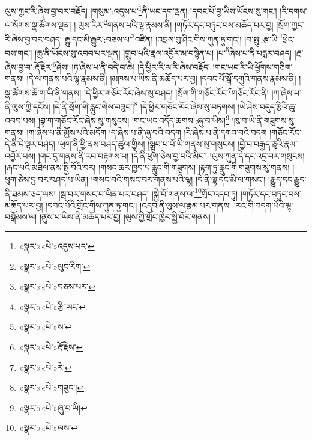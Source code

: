 ལུས་ཀྱང་རི་ཞེས་བྱ་བར་བརྗོད། །གསུམ་:འདུས་པ་\footnote{«སྣར་»«པེ་»འདུས་པར་}ནི་ཡང་དག་ལྡན། །དབང་པོ་བྱ་ཡིས་ཡོངས་སུ་གང་། །རི་དགས་ལ་སོགས་སྣ་ཚོགས་ལྡན། །:ལུས་རིར་\footnote{«སྣར་»«པེ་»ལུང་རིག་}གནས་པའི་ལྷ་རྣམས་ནི། །གཏོར་དང་བཏུང་བས་མཆོད་པར་བྱ། །སྲོག་ཀྱང་རི་ཞེས་བྱ་བར་བཤད། རྒྱུ་དང་མི་རྒྱུར་:བཅས་པ་\footnote{«སྣར་»«པེ་»བཅས་པར་}འཛིན། །འབྲས་བུ་ཤིང་གིས་ཀུན་ཏུ་གང་། །བ་སྤུ་:རྩ་ཡི་\footnote{«སྣར་»«པེ་»རྩི་ཡང་}ཕྲེང་བས་གང་། །ཆུ་ནི་ཡོངས་སུ་འབབ་པར་ལྡན། །གྲུབ་པའི་རྣལ་འབྱོར་མ་བསྙེན་པ། །པ་\footnote{«སྣར་»«པེ་»ས་}ཞེས་པ་ནི་པདྨར་བཤད། །རྦ་ཞེས་བྱ་བ་:རྡོ་རྗེར་\footnote{«སྣར་»«པེ་»རྡོ་རྗེས་}ཤེས། །ཏ་ཞེས་པ་ནི་བདེ་བ་ཆེ། །དེ་ཕྱིར་རི་ལ་རི་ཞེས་བརྗོད། །གང་ཡང་རི་ཡི་ཕྱོགས་གཅིག་གནས། །དེ་ལ་གནས་པའི་ལྷ་རྣམས་ནི། །མཁས་པ་ཡིས་ནི་མཆོད་པར་བྱ། །དབང་པོ་སྒོ་དགུའི་གནས་རྣམས་ནི། །སྣ་ཚོགས་ཆོ་ག་ཡི་ནི་གནས། །དེ་ཕྱིར་གཅོང་རོང་ཞེས་སུ་བཤད། །སྲོག་གི་གཅོང་རོང་\footnote{«སྣར་»«པེ་»རེ་}གཅོང་རོང་ནི། །ཀ་ཞེས་པ་ནི་ལུས་ཀྱི་དངོས། །དེ་ནི་སྲོག་གི་རླུང་གིས་བཟུང་།\footnote{«སྣར་»«པེ་»གཟུང་།} །དེ་ཕྱིར་གཅོང་རོང་ཞེས་སུ་བཏགས། །ཡེ་ཤེས་བདུད་རྩིའི་ཆུ་འབབ་པས། །བྷ་ག་གཅོང་རོང་ཞེས་སུ་གསུངས། །གང་ཡང་འདོད་ཆགས་:ཞུ་བ་ཡིས།\footnote{«སྣར་»«པེ་»ཞུ་བ་ཡི།} །ཁུ་བ་ཡི་ནི་གཟུགས་སུ་གནས། །ཀ་ཞེས་པ་ནི་མྱོས་པའི་མདོག །ད་ཞེས་པ་ནི་ཞུ་བའི་བདག །རི་ཞེས་པ་ནི་དགའ་བའི་བདག །གཅོང་རོང་དེ་ནི་དེ་ལྟར་བཤད། །ཕུག་ནི་ཕྱི་ནས་བཤད་ཚུལ་གྱིས། །སྒྲུབ་པ་པོ་ཡི་གནས་སུ་གསུངས། །བྱེ་བ་བརྒྱད་ཅུའི་རྣལ་འབྱོར་པས། །གང་དུ་གནས་ནི་རབ་བརྟགས་པ། །དེ་ནི་ཕུག་ཅེས་བྱ་བའི་མིང་། །ལུས་ཀུན་དེ་དང་འདྲ་བར་གསུངས། །རྐང་པའི་མཐིལ་ནས་སྤྱི་བོའི་བར། །གསང་ཆར་ཁྱབ་པ་རླུང་གི་གཟུགས། །རྟག་ཏུ་རླུང་གི་གཟུགས་སུ་གནས། །ཕུག་ཅེས་བྱ་བར་བཤད་པ་ཡིན། །གསང་བའི་གསང་བར་གནས་པའི་ལྷ། །དེ་ནི་ལྷ་དང་མི་ལ་གསང་། །རྒྱུད་དང་རྒྱུད་ནི་ཐམས་ཅད་ལས། །སྦ་བར་གསང་བ་ཡིན་པར་བཤད། །སྐྱེ་བོ་གནས་ལ་\footnote{«སྣར་»«པེ་»ལས་}གྲོང་འདབ་ཏུ། །གཏོར་དང་བཏུང་བས་མཆོད་པར་བྱ། །དབང་པོའི་གྲོང་གིས་ཀུན་ཏུ་གང་། །འདབ་ནི་ལུས་ལ་རྣམ་པར་གནས། །རང་གི་བདག་པོའི་ལྷ་བསྒོམས་ལ། །ནུས་པ་ཡིས་ནི་མཆོད་པར་བྱ། །ལུས་ཀྱི་གྲོང་ཁྱེར་སྤྱི་བོར་གནས། །
